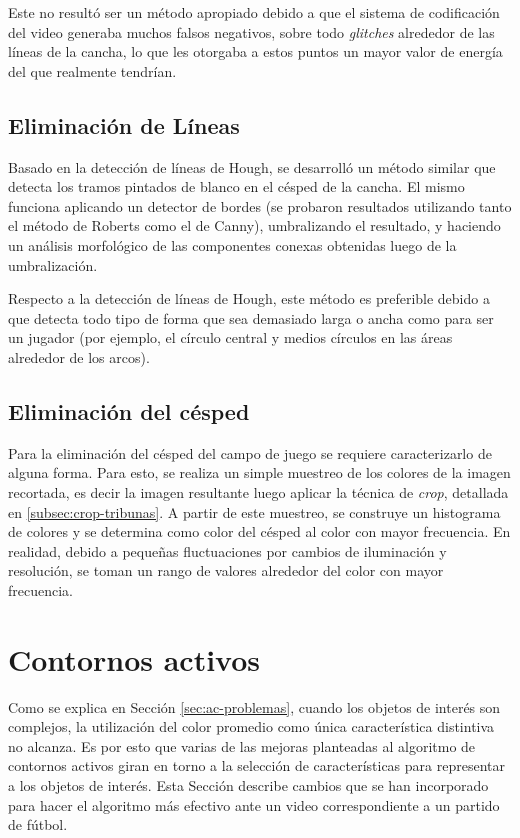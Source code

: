 Este no resultó ser un método apropiado debido a que el sistema de codificación
del video generaba muchos falsos negativos, sobre todo \textit{glitches}
alrededor de las líneas de la cancha, lo que les otorgaba a estos puntos un
mayor valor de energía del que realmente tendrían.


\subsection{Eliminación de Líneas}

Basado en la detección de líneas de Hough, se desarrolló un método similar que
detecta los tramos pintados de blanco en el césped de la cancha. El mismo
funciona aplicando un detector de bordes (se probaron resultados utilizando
tanto el método de Roberts como el de Canny), umbralizando el resultado, y
haciendo un análisis morfológico de las componentes conexas obtenidas luego de
la umbralización.

Respecto a la detección de líneas de Hough, este método es preferible debido
a que detecta todo tipo de forma que sea demasiado larga o ancha como para
ser un jugador (por ejemplo, el círculo central y medios círculos en las
áreas alrededor de los arcos).

\subsection{Eliminación del césped}

Para la eliminación del césped del campo de juego se requiere caracterizarlo
de alguna forma. Para esto, se realiza un simple muestreo de los colores de
la imagen recortada, es decir la imagen resultante luego aplicar la técnica
de \textit{crop}, detallada en \ref{subsec:crop-tribunas}. A partir de este
muestreo, se construye un histograma de colores y se determina como color del
césped al color con mayor frecuencia. En realidad, debido a pequeñas
fluctuaciones por cambios de iluminación y resolución, se toman un rango de
valores alrededor del color con mayor frecuencia.

\section{Contornos activos}
\label{sec:ac-extension}

Como se explica en Sección \ref{sec:ac-problemas}, cuando los objetos de
interés son complejos, la utilización del color promedio como única
característica distintiva no alcanza. Es por esto que varias de las mejoras
planteadas al algoritmo de contornos activos giran en torno a la selección de
características para representar a los objetos de interés. Esta Sección
describe cambios que se han incorporado para hacer el algoritmo más efectivo
ante un video correspondiente a un partido de fútbol.

